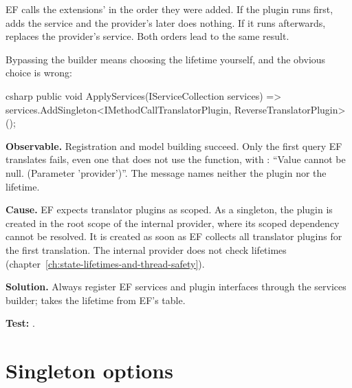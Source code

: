 \begin{note}
  EF calls the extensions'  in the order they were added.
  If the plugin runs first,  adds the service and the provider's later
   does nothing. If it runs afterwards,  replaces
  the provider's service. Both orders lead to the same result.
\end{note}

Bypassing the builder means choosing the lifetime yourself, and the obvious choice is wrong:

\begin{sourcecode}{csharp}
public void ApplyServices(IServiceCollection services)
    => services.AddSingleton<IMethodCallTranslatorPlugin, ReverseTranslatorPlugin>();
\end{sourcecode}

\begin{failure}
  \textbf{Observable.} Registration and model building succeed. Only the first query EF
  translates fails, even one that does not use the function, with :
  “Value cannot be null. (Parameter 'provider')”. The message names neither the plugin nor
  the lifetime.

  \textbf{Cause.} EF expects translator plugins as scoped. As a singleton, the plugin is
  created in the root scope of the internal provider, where its scoped dependency
   cannot be resolved. It is created as
  soon as EF collects all translator plugins for the first translation. The internal
  provider does not check lifetimes (chapter~\ref{ch:state-lifetimes-and-thread-safety}).

  \textbf{Solution.} Always register EF services and plugin interfaces through the services
  builder;  takes the lifetime from EF's table.

  \textbf{Test:}
  .
\end{failure}

\section{Singleton options}

